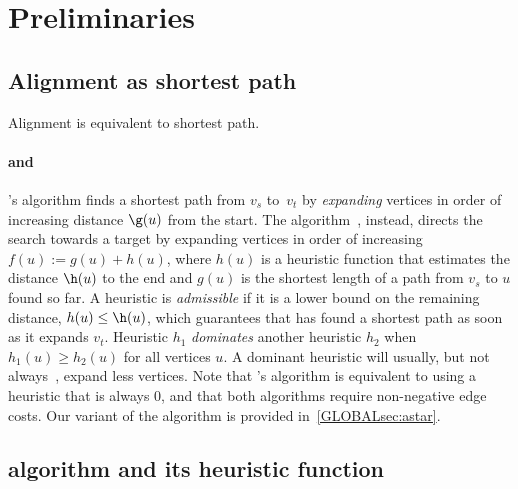 \section{Preliminaries}

\subsection{Alignment as shortest path}

Alignment is equivalent to shortest path.

\paragraph{\dijkstra and \A}
\dijkstra's algorithm \citep{dijkstra1959note} finds a shortest path from $v_s$
to~$v_t$ by \emph{expanding} vertices in order of increasing distance $\g(u)$
from the start. The \A algorithm~\citep{hart1968formal,pearl1984heuristics},
instead, directs the search towards a target by expanding vertices in order of
increasing ${f(u) := g(u) + h(u)}$, where $h(u)$ is a heuristic function that
estimates the distance $\h(u)$ to the end and $g(u)$ is the shortest length of a
path from $v_s$ to $u$ found so far. A heuristic is \emph{admissible} if it is a
lower bound on the remaining distance, $h(u) \leq \h(u)$, which guarantees that
\A has found a shortest path as soon as it expands $v_t$. Heuristic $h_1$
\emph{dominates} another heuristic $h_2$ when $h_1(u) \ge h_2(u)$ for all vertices $u$.
A dominant heuristic will usually, but not always~\citep{holte2010common},
expand less vertices. Note that \dijkstra's algorithm is
equivalent to \A using a heuristic that is always $0$, and that both algorithms
require non-negative edge costs. Our variant of the \A algorithm is provided
in~\cref{GLOBALsec:astar}.

\subsection{\A algorithm and its heuristic function} \label{sec:astar}

